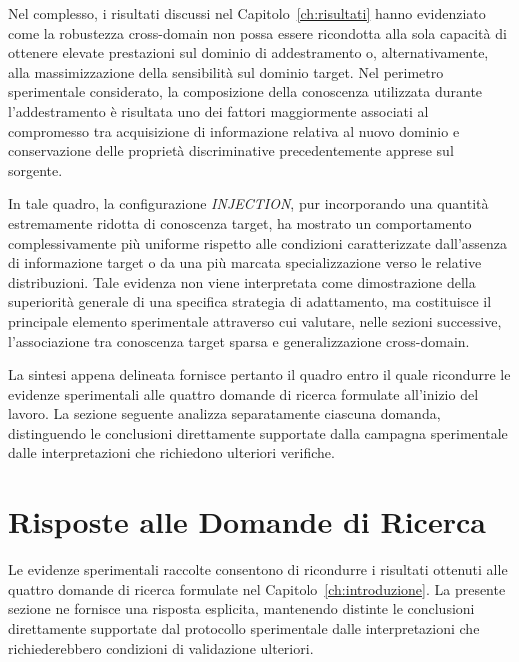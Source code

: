 Nel complesso, i risultati discussi nel Capitolo~\ref{ch:risultati} hanno evidenziato come la robustezza cross-domain non possa essere ricondotta alla sola capacità di ottenere elevate prestazioni sul dominio di addestramento o, alternativamente, alla massimizzazione della sensibilità sul dominio target. 
Nel perimetro sperimentale considerato, la composizione della conoscenza utilizzata durante l'addestramento è risultata uno dei fattori maggiormente associati al compromesso tra acquisizione di informazione relativa al nuovo dominio e conservazione delle proprietà discriminative precedentemente apprese sul sorgente.

In tale quadro, la configurazione \textit{INJECTION}, pur incorporando una quantità estremamente ridotta di conoscenza target, ha mostrato un comportamento complessivamente più uniforme rispetto alle condizioni caratterizzate dall'assenza di informazione target o da una più marcata specializzazione verso le relative distribuzioni. 
Tale evidenza non viene interpretata come dimostrazione della superiorità generale di una specifica strategia di adattamento, ma costituisce il principale elemento sperimentale attraverso cui valutare, nelle sezioni successive, l'associazione tra conoscenza target sparsa e generalizzazione cross-domain.

La sintesi appena delineata fornisce pertanto il quadro entro il quale ricondurre le evidenze sperimentali alle quattro domande di ricerca formulate all'inizio del lavoro. 
La sezione seguente analizza separatamente ciascuna domanda, distinguendo le conclusioni direttamente supportate dalla campagna sperimentale dalle interpretazioni che richiedono ulteriori verifiche.




\section{Risposte alle Domande di Ricerca}
\label{sec:risposte_rq}

Le evidenze sperimentali raccolte consentono di ricondurre i risultati ottenuti alle quattro domande di ricerca formulate nel Capitolo~\ref{ch:introduzione}.
La presente sezione ne fornisce una risposta esplicita, mantenendo distinte le conclusioni direttamente supportate dal protocollo sperimentale dalle interpretazioni che richiederebbero condizioni di validazione ulteriori.


